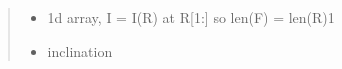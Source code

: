 \documentclass[a4paper,11pt,english]{sphinxmanual}
\begin{document}
\begin{fulllineitems}
\begin{fulllineitems}
\begin{quote}
\begin{description}
\begin{itemize}
\item {} 
\sphinxAtStartPar
{} \textendash{} 1d array, I = I(R) at R{[}1:{]}
so len(F) = len(R)\sphinxhyphen{}1

\item {} 
\sphinxAtStartPar
{} \textendash{} inclination

\end{itemize}

\end{description}\end{quote}

\end{fulllineitems}


\end{fulllineitems}

\end{document}
